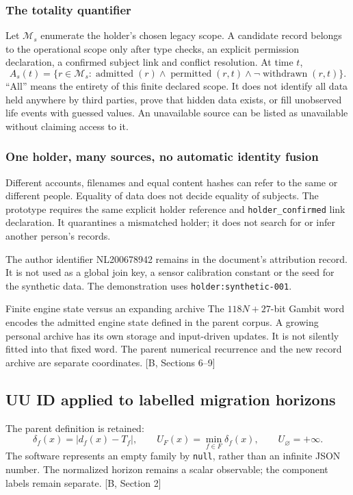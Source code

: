 \documentclass[11pt,a4paper]{article}
\newcommand{\newpagehead}[1]{\clearpage\subsection{#1}}
\newcommand{\source}[1]{{\sffamily\small\color{slate}[#1]}}
\begin{document}
\subsubsection{The totality quantifier}
Let $\mathcal M_s$ enumerate the holder's chosen legacy scope. A candidate record belongs to the operational scope only after type checks, an explicit permission declaration, a confirmed subject link and conflict resolution. At time $t$,
\[
 A_s(t)=\{r\in\mathcal M_s:\operatorname{admitted}(r)\land
           \operatorname{permitted}(r,t)\land\neg\operatorname{withdrawn}(r,t)\}.
\]
``All'' means the entirety of this finite declared scope. It does not identify all data held anywhere by third parties, prove that hidden data exists, or fill unobserved life events with guessed values. An unavailable source can be listed as unavailable without claiming access to it.

\subsubsection{One holder, many sources, no automatic identity fusion}
Different accounts, filenames and equal content hashes can refer to the same or different people. Equality of data does not decide equality of subjects. The prototype requires the same explicit holder reference and \texttt{holder\_confirmed} link declaration. It quarantines a mismatched holder; it does not search for or infer another person's records.

The author identifier NL200678942 remains in the document's attribution record. It is not used as a global join key, a sensor calibration constant or the seed for the synthetic data. The demonstration uses \texttt{holder:synthetic-001}.

\begin{note}{Finite engine state versus an expanding archive}
The $118N+27$-bit Gambit word encodes the admitted engine state defined in the parent corpus. A growing personal archive has its own storage and input-driven updates. It is not silently fitted into that fixed word. The parent numerical recurrence and the new record archive are separate coordinates. \source{B, Sections 6--9}
\end{note}

\newpagehead{UU ID applied to labelled migration horizons}
The parent definition is retained:
\[
 \delta_f(x)=|d_f(x)-T_f|,\qquad
 U_F(x)=\min_{f\in F}\delta_f(x),\qquad U_\varnothing=+\infty.
\]
The software represents an empty family by \texttt{null}, rather than an infinite JSON number. The normalized horizon remains a scalar observable; the component labels remain separate. \source{B, Section 2}
\end{document}
